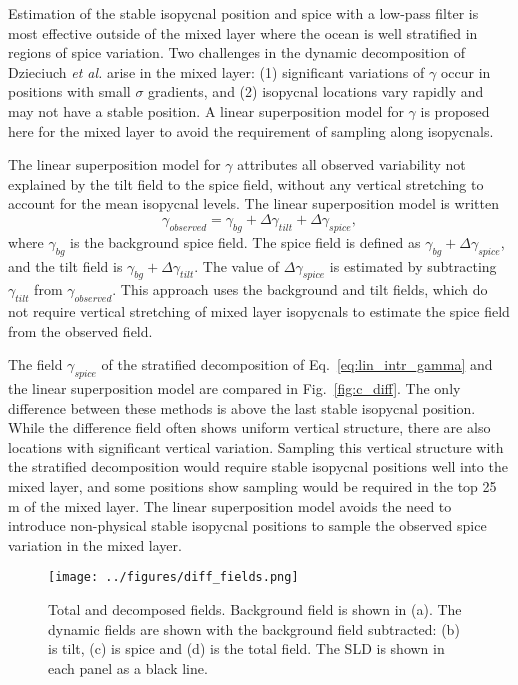 \documentclass[preprint,NumberedRefs]{JASA}
\begin{document}
Estimation of the stable isopycnal position and spice with a low-pass filter is most effective outside of the mixed layer where the ocean is well stratified in regions of spice variation. Two challenges in the dynamic decomposition of Dzieciuch \emph{et al.}\citep{dzieciuch2004} arise in the mixed layer: (1) significant variations of $\gamma$ occur in positions with small $\sigma$ gradients, and (2) isopycnal locations vary rapidly and may not have a stable position. A linear superposition model for $\gamma$ is proposed here for the mixed layer to avoid the requirement of sampling along isopycnals.

The linear superposition model for $\gamma$ attributes all observed variability not explained by the tilt field to the spice field, without any vertical stretching to account for the mean isopycnal levels. The linear superposition model is written
\begin{equation}
    \gamma_{observed} = \gamma_{bg} + \Delta \gamma_{tilt} + \Delta \gamma_{spice},
    \label{eq:lin_sup}
\end{equation}
where $\gamma_{bg}$ is the background spice field. The spice field is defined as $\gamma_{bg} + \Delta \gamma_{spice}$, and the tilt field is $\gamma_{bg} + \Delta \gamma_{tilt}$. The value of $\Delta \gamma_{spice}$ is estimated by subtracting $\gamma_{tilt}$ from $\gamma_{observed}$. This approach uses the background and tilt fields, which do not require vertical stretching of mixed layer isopycnals to estimate the spice field from the observed field.

The field $\gamma_{spice}$ of the stratified decomposition of Eq.~\eqref{eq:lin_intr_gamma} and the linear superposition model are compared in Fig.~\ref{fig:c_diff}. The only difference between these methods is above the last stable isopycnal position. While the difference field often shows uniform vertical structure, there are also locations with significant vertical variation. Sampling this vertical structure with the stratified decomposition would require stable isopycnal positions well into the mixed layer, and some positions show sampling would be required in the top 25 m of the mixed layer. The linear superposition model avoids the need to introduce non-physical stable isopycnal positions to sample the observed spice variation in the mixed layer.

\begin{figure}
\texttt{[image: ../figures/diff\_fields.png]}
        \caption{\label{fig:c_fields}{Total and decomposed fields. Background field is shown in (a). The dynamic fields are shown with the background field subtracted: (b) is tilt, (c) is spice and (d) is the total field. The SLD is shown in each panel as a black line.}}
\end{figure}
\end{document}
